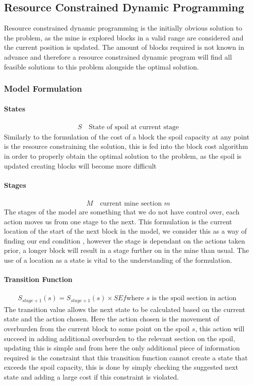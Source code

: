 \subsection{Resource Constrained Dynamic Programming}
Resource constrained dynamic programming is the initially obvious solution to the problem, as the mine is explored blocks in a valid range are considered and the current position is updated. The amount of blocks required is not known in advance and therefore a resource constrained dynamic program will find all feasible solutions to this problem alongside the optimal solution. 
\subsubsection{Model Formulation}
\paragraph*{States}
\begin{align}
\label{Stte}
S \quad \text{State of spoil at current stage}
\end{align}
Similarly to the formulation of the cost of a block the spoil capacity at any point is the resource constraining the solution, this is fed into the block cost algorithm in order to properly obtain the optimal solution to the problem, as the spoil is updated creating blocks will become more difficult 
\paragraph*{Stages}
\begin{align}
\label{DP:Stage0}
M \quad \text{current mine section }m 
\end{align}
The stages of the model are something that we do not have control over, each action moves us from one stage to the next. This formulation is the current location of the start of the next block in the model, we consider this as a way of finding our end condition , however the stage is dependant on the actions taken prior, a longer block will result in a stage further on in the mine than usual. The use of a location as a state is vital to the understanding of the formulation. 
\paragraph*{Transition Function}
\begin{align}
\label{Transition}
S_{stage+1}(s)=S_{stage+1}(s)\times SEf  \text{where $s$ is the spoil section in action }
\end{align}
The transition value allows the next state to be calculated based on the current state and the action chosen. Here the action chosen is the movement of overburden from the current block to some point on the spoil $s$, this action will succeed in adding additional overburden to the relevant section on the spoil, updating this is simple and from here the only additional piece of information required is the constraint that this transition function cannot create a state that exceeds the spoil capacity, this is done by simply checking the suggested next state and adding a large cost if this constraint is violated. 
